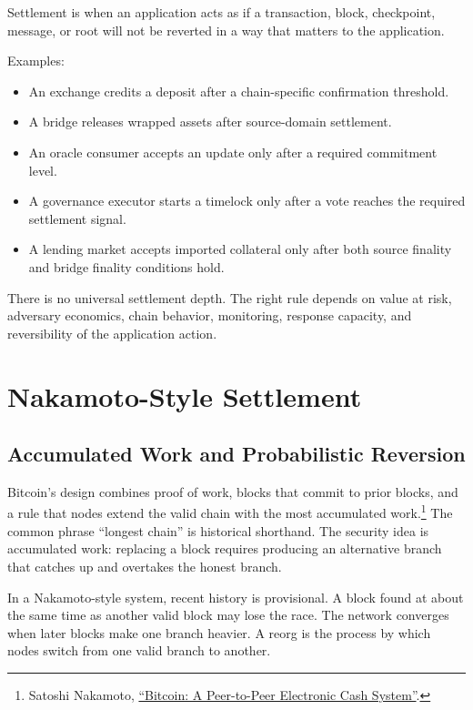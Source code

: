Settlement is when an application acts as if a transaction, block, checkpoint, message, or root will not be reverted in a way that matters to the application.

Examples:

\begin{itemize}
\item An exchange credits a deposit after a chain-specific confirmation threshold.
\item A bridge releases wrapped assets after source-domain settlement.
\item An oracle consumer accepts an update only after a required commitment level.
\item A governance executor starts a timelock only after a vote reaches the required settlement signal.
\item A lending market accepts imported collateral only after both source finality and bridge finality conditions hold.
\end{itemize}

There is no universal settlement depth. The right rule depends on value at risk, adversary economics, chain behavior, monitoring, response capacity, and reversibility of the application action.

\section{Nakamoto-Style Settlement}

\subsection{Accumulated Work and Probabilistic Reversion}

Bitcoin's design combines proof of work, blocks that commit to prior blocks, and a rule that nodes extend the valid chain with the most accumulated work.\footnote{Satoshi Nakamoto, \href{https://bitcoin.org/bitcoin.pdf}{``Bitcoin: A Peer-to-Peer Electronic Cash System''}.} The common phrase ``longest chain'' is historical shorthand. The security idea is accumulated work: replacing a block requires producing an alternative branch that catches up and overtakes the honest branch.

In a Nakamoto-style system, recent history is provisional. A block found at about the same time as another valid block may lose the race. The network converges when later blocks make one branch heavier. A reorg is the process by which nodes switch from one valid branch to another.

